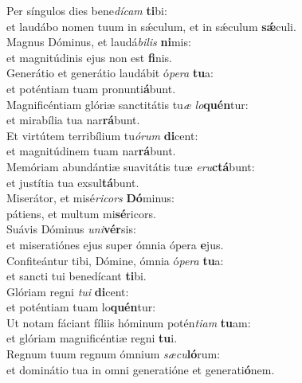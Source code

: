 \evenverse Per síngulos dies bene\textit{dí}\textit{cam} \textbf{ti}bi:~\*\\
\evenverse et laudábo nomen tuum in sǽculum, et in sǽculum \textbf{sǽ}culi.\\
\oddverse Magnus Dóminus, et laudá\textit{bi}\textit{lis} \textbf{ni}mis:~\*\\
\oddverse et magnitúdinis ejus non est \textbf{fi}nis.\\
\evenverse Generátio et generátio laudábit ó\textit{pe}\textit{ra} \textbf{tu}a:~\*\\
\evenverse et poténtiam tuam pronunti\textbf{á}bunt.\\
\oddverse Magnificéntiam glóriæ sanctitátis tu\textit{æ} \textit{lo}\textbf{quén}tur:~\*\\
\oddverse et mirabília tua nar\textbf{rá}bunt.\\
\evenverse Et virtútem terribílium tu\textit{ó}\textit{rum} \textbf{di}cent:~\*\\
\evenverse et magnitúdinem tuam nar\textbf{rá}bunt.\\
\oddverse Memóriam abundántiæ suavitátis tuæ \textit{e}\textit{ru}\textbf{ctá}bunt:~\*\\
\oddverse et justítia tua exsul\textbf{tá}bunt.\\
\evenverse Miserátor, et misé\textit{ri}\textit{cors} \textbf{Dó}minus:~\*\\
\evenverse pátiens, et multum mi\textbf{sé}ricors.\\
\oddverse Suávis Dóminus \textit{u}\textit{ni}\textbf{vér}sis:~\*\\
\oddverse et miseratiónes ejus super ómnia ópera \textbf{e}jus.\\
\evenverse Confiteántur tibi, Dómine, ómnia ó\textit{pe}\textit{ra} \textbf{tu}a:~\*\\
\evenverse et sancti tui benedícant \textbf{ti}bi.\\
\oddverse Glóriam regni \textit{tu}\textit{i} \textbf{di}cent:~\*\\
\oddverse et poténtiam tuam lo\textbf{quén}tur:\\
\evenverse Ut notam fáciant fíliis hóminum potén\textit{ti}\textit{am} \textbf{tu}am:~\*\\
\evenverse et glóriam magnificéntiæ regni \textbf{tu}i.\\
\oddverse Regnum tuum regnum ómnium \textit{sæ}\textit{cu}\textbf{ló}rum:~\*\\
\oddverse et dominátio tua in omni generatióne et generati\textbf{ó}nem.\\
